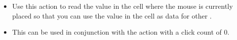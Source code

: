 
\begin{itemize}
\item Use this action to read the value in the cell where the mouse is currently placed so that you can use the value in the cell as data for other \gdsteps{}.
 \item This can be used in conjunction with the action   with a click count of 0.  
\end{itemize}

